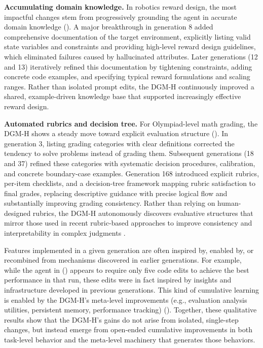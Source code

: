 \documentclass{article}
\begin{document}
\textbf{Accumulating domain knowledge.} In robotics reward design, the most impactful changes stem from progressively grounding the agent in accurate domain knowledge (). A major breakthrough in generation 8 added comprehensive documentation of the target environment, explicitly listing valid state variables and constraints and providing high-level reward design guidelines, which eliminated failures caused by hallucinated attributes. Later generations (12 and 13) iteratively refined this documentation by tightening constraints, adding concrete code examples, and specifying typical reward formulations and scaling ranges. Rather than isolated prompt edits, the DGM-H continuously improved a shared, example-driven knowledge base that supported increasingly effective reward design.

\textbf{Automated rubrics and decision tree.} For Olympiad-level math grading, the DGM-H shows a steady move toward explicit evaluation structure (). In generation 3, listing grading categories with clear definitions corrected the tendency to solve problems instead of grading them. Subsequent generations (18 and 37) refined these categories with systematic decision procedures, calibration, and concrete boundary-case examples. Generation 168 introduced explicit rubrics, per-item checklists, and a decision-tree framework mapping rubric satisfaction to final grades, replacing descriptive guidance with precise logical flow and substantially improving grading consistency.
Rather than relying on human-designed rubrics, the DGM-H autonomously discovers evaluative structures that mirror those used in recent rubric-based approaches to improve consistency and interpretability in complex judgments \citep{cook2024ticking, fan2024sedareval, chen2026automated, lv2026rubrics}.

Features implemented in a given generation are often inspired by, enabled by, or recombined from mechanisms discovered in earlier generations. For example, while the agent in () appears to require only five code edits to achieve the best performance in that run, these edits were in fact inspired by insights and infrastructure developed in previous generations. This kind of cumulative learning is enabled by the DGM-H's meta-level improvements (e.g., evaluation analysis utilities, persistent memory, performance tracking) (). Together, these qualitative results show that the DGM-H's gains do not arise from isolated, single-step changes, but instead emerge from open-ended cumulative improvements in both task-level behavior and the meta-level machinery that generates those behaviors.
\end{document}
